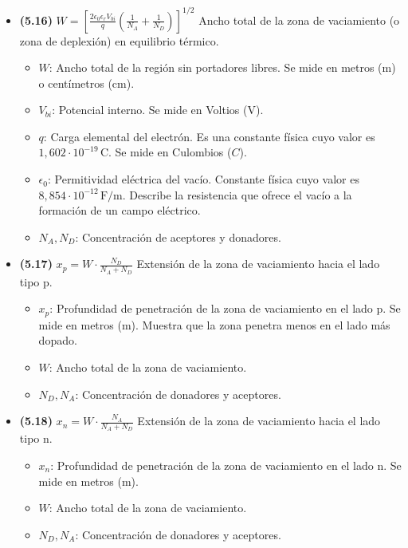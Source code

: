 \documentclass{article}
\begin{document}
\begin{itemize}
				\item \textbf{(5.16)} $\boxed{W = \left[ \frac{2\epsilon_0\epsilon_r V_{bi}}{q} \left( \frac{1}{N_A} + \frac{1}{N_D} \right) \right]^{1/2}}$ Ancho total de la zona de vaciamiento (o zona de deplexión) en equilibrio térmico.
					\begin{itemize}
						\item $W$: Ancho total de la región sin portadores libres. Se mide en metros (m) o centímetros (cm).
						\item $V_{bi}$: Potencial interno. Se mide en Voltios (V).
						\item $q$: Carga elemental del electrón. Es una constante física cuyo valor es $1,602\cdot10^{-19}\,\text{C}$. Se mide en Culombios ($C$).
						\item $\epsilon_{0}$: Permitividad eléctrica del vacío. Constante física cuyo valor es $8,854\cdot10^{-12}\,\text{F/m}$. Describe la resistencia que ofrece el vacío a la formación de un campo eléctrico.
						\item $N_A, N_D$: Concentración de aceptores y donadores.
					\end{itemize}

				\item \textbf{(5.17)} $\boxed{x_p = W \cdot \frac{N_D}{N_A + N_D}}$ Extensión de la zona de vaciamiento hacia el lado tipo p.
					\begin{itemize}
						\item $x_p$: Profundidad de penetración de la zona de vaciamiento en el lado p. Se mide en metros (m). Muestra que la zona penetra menos en el lado más dopado.
						\item $W$: Ancho total de la zona de vaciamiento.
						\item $N_D, N_A$: Concentración de donadores y aceptores.
					\end{itemize}

				\item \textbf{(5.18)} $\boxed{x_n = W \cdot \frac{N_A}{N_A + N_D}}$ Extensión de la zona de vaciamiento hacia el lado tipo n.
					\begin{itemize}
						\item $x_n$: Profundidad de penetración de la zona de vaciamiento en el lado n. Se mide en metros (m).
						\item $W$: Ancho total de la zona de vaciamiento.
						\item $N_D, N_A$: Concentración de donadores y aceptores.
					\end{itemize}


\end{itemize}
\end{document}
